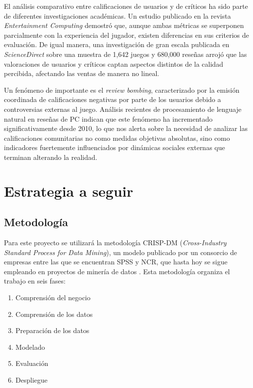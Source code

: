 \documentclass[letterpaper,11pt]{article}
\begin{document}
El análisis comparativo entre calificaciones de usuarios y de críticos ha sido parte de diferentes investigaciones académicas. Un estudio publicado en la revista \textit{Entertainment Computing} demostró que, aunque ambas métricas se superponen parcialmente con la experiencia del jugador, existen diferencias en sus criterios de evaluación. De igual manera, una investigación de gran escala publicada en \textit{ScienceDirect} sobre una muestra de 1,642 juegos y 680,000 reseñas arrojó que las valoraciones de usuarios y críticos captan aspectos distintos de la calidad percibida, afectando las ventas de manera no lineal. 

Un fenómeno de importante es el \textit{review bombing}, caracterizado por la emisión coordinada de calificaciones negativas por parte de los usuarios debido a controversias externas al juego. Análisis recientes de procesamiento de lenguaje natural en reseñas de PC indican que este fenómeno ha incrementado significativamente desde 2010, lo que nos alerta sobre la necesidad de analizar las calificaciones comunitarias no como medidas objetivas absolutas, sino como indicadores fuertemente influenciados por dinámicas sociales externas que terminan alterando la realidad.




\section{Estrategia a seguir}

\subsection*{Metodología}

Para este proyecto se utilizará la metodología CRISP-DM (\textit{Cross-Industry Standard Process for Data Mining}), un modelo publicado por un consorcio de empresas entre las que se encuentran SPSS y NCR, que hasta hoy se sigue empleando en proyectos de minería de datos \parencite{chapman2000crisp}. Esta metodología organiza el trabajo en seis fases:

\begin{enumerate}
  \item Comprensión del negocio
  \item Comprensión de los datos
  \item Preparación de los datos
  \item Modelado
  \item Evaluación
  \item Despliegue
\end{enumerate}
\end{document}
